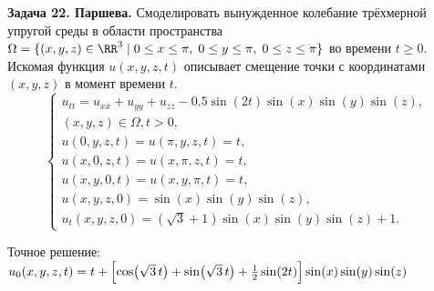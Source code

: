 \documentclass{article}
\begin{document}
\textbf{Задача 22. Паршева.} Смоделировать вынужденное колебание трёхмерной упругой среды в области пространства $\Omega = \{(x, y, z) \in \RR^3 \mid 0 \le x \le \pi,\; 0 \le y \le \pi,\; 0 \le z \le \pi\}$ во времени $t \ge 0$. Искомая функция $u(x, y, z, t)$ описывает смещение точки с координатами $(x, y, z)$ в момент времени $t$.
\begin{equation*}
    \begin{cases}
        u_{tt} = u_{xx} + u_{yy} + u_{zz} - 0.5\sin(2t)\sin(x)\sin(y)\sin(z), \\
        (x, y, z) \in \Omega, t > 0, \\
        u(0, y, z, t) = u(\pi, y, z, t) = t, \\
        u(x, 0, z, t) = u(x, \pi, z, t) = t, \\
        u(x, y, 0, t) = u(x, y, \pi, t) = t, \\
        u(x, y, z, 0) = \sin(x)\sin(y)\sin(z), \\
        u_t(x, y, z, 0) = (\sqrt{3} + 1)\sin(x)\sin(y)\sin(z) + 1.
    \end{cases}
    \label{eq:problem}
\end{equation*}

Точное решение: $u_0(x,y,z,t) = t + \Bigl[ \cos\bigl(\sqrt{3}\,t\bigr) + \sin\bigl(\sqrt{3}\,t\bigr) + \frac{1}{2}\sin(2t) \Bigr] \sin(x)\sin(y)\sin(z)$
\end{document}
